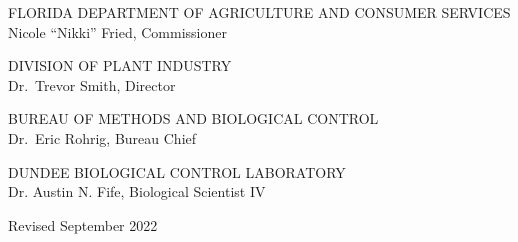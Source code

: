 \documentclass{sop_class}[overrideChapters] %
\begin{document}

\docBodyfalse
\begin{center}
    \thispagestyle{empty}%
      \vspace*{-0.4in}%
          \vfill%
            FLORIDA DEPARTMENT OF AGRICULTURE AND CONSUMER SERVICES\\
            {Nicole ``Nikki'' Fried}, Commissioner\\
            \bigbreak%
            
            DIVISION OF \MakeUppercase{Plant Industry}\\
            {Dr.~Trevor Smith}, Director\\
            \bigbreak%
            
            BUREAU OF \MakeUppercase{Methods and Biological Control}\\
            {Dr.~Eric Rohrig}, Bureau Chief\\
            \bigbreak%
             
            
            \vspace*{4in}%
            
            DUNDEE BIOLOGICAL CONTROL LABORATORY\\
            Dr. Austin N. Fife, Biological Scientist IV\\
            \bigbreak%
            
            Revised {September 2022}\\ 
          \vfill%
\end{center}
\newpage


\realSingleSpace
  \tableofcontents %


% 

\listoffigures
\end{document}
